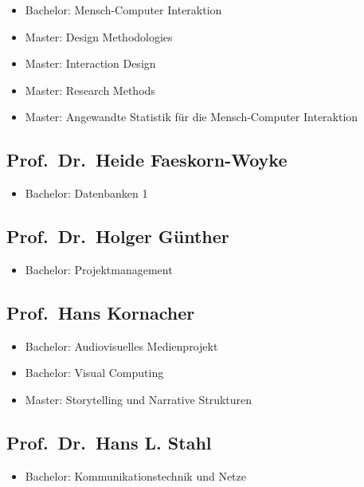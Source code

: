 \begin{itemize}
\tightlist
\item
  Bachelor: Mensch-Computer Interaktion
\item
  Master: Design Methodologies
\item
  Master: Interaction Design
\item
  Master: Research Methods
\item
  Master: Angewandte Statistik für die Mensch-Computer Interaktion
\end{itemize}

\subsection{Prof.~Dr.~Heide
Faeskorn-Woyke}\label{prof.dr.heide-faeskorn-woyke}

\begin{itemize}
\tightlist
\item
  Bachelor: Datenbanken 1
\end{itemize}

\subsection{Prof.~Dr.~Holger
Günther}\label{prof.dr.holger-guxfcnther}

\begin{itemize}
\tightlist
\item
  Bachelor: Projektmanagement
\end{itemize}

\subsection{Prof.~Hans Kornacher}\label{prof.hans-kornacher}

\begin{itemize}
\tightlist
\item
  Bachelor: Audiovisuelles Medienprojekt
\item
  Bachelor: Visual Computing
\item
  Master: Storytelling und Narrative Strukturen
\end{itemize}

\subsection{Prof.~Dr.~Hans L. Stahl}\label{prof.dr.hans-l.-stahl}

\begin{itemize}
\tightlist
\item
  Bachelor: Kommunikationstechnik und Netze
\end{itemize}


